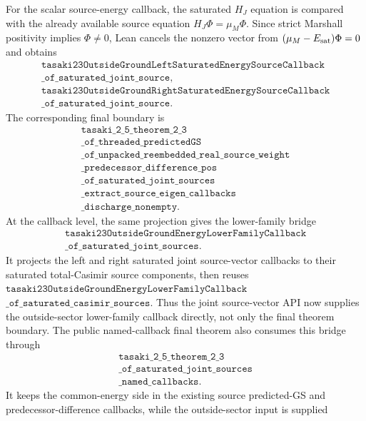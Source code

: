 \documentclass[a4paper,11pt]{article}
\begin{document}
For the scalar source-energy callback, the saturated \(H_J\) equation is
compared with the already available source equation
\(H_J\Phi=\mu_M\Phi\).  Since strict Marshall positivity implies
\(\Phi\neq0\), Lean cancels the nonzero vector from
\((\mu_M-E_{\rm sat})\Phi=0\) and obtains
\[
\begin{gathered}
\texttt{tasaki23OutsideGroundLeftSaturatedEnergySourceCallback}\\
\texttt{\_of\_saturated\_joint\_source},\\
\texttt{tasaki23OutsideGroundRightSaturatedEnergySourceCallback}\\
\texttt{\_of\_saturated\_joint\_source}.
\end{gathered}
\]
The corresponding final boundary is
\[
\begin{gathered}
\texttt{tasaki\_2\_5\_theorem\_2\_3}\\
\texttt{\_of\_threaded\_predictedGS}\\
\texttt{\_of\_unpacked\_reembedded\_real\_source\_weight}\\
\texttt{\_predecessor\_difference\_pos}\\
\texttt{\_of\_saturated\_joint\_sources}\\
\texttt{\_extract\_source\_eigen\_callbacks}\\
\texttt{\_discharge\_nonempty}.
\end{gathered}
\]
At the callback level, the same projection gives the lower-family bridge
\[
\begin{gathered}
\texttt{tasaki23OutsideGroundEnergyLowerFamilyCallback}\\
\texttt{\_of\_saturated\_joint\_sources}.
\end{gathered}
\]
It projects the left and right saturated joint source-vector callbacks to
their saturated total-Casimir source components, then reuses
\(\texttt{tasaki23OutsideGroundEnergyLowerFamilyCallback}\)
\(\texttt{\_of\_saturated\_casimir\_sources}\).  Thus the joint
source-vector API now supplies the outside-sector lower-family callback
directly, not only the final theorem boundary.
The public named-callback final theorem also consumes this bridge through
\[
\begin{gathered}
\texttt{tasaki\_2\_5\_theorem\_2\_3}\\
\texttt{\_of\_saturated\_joint\_sources}\\
\texttt{\_named\_callbacks}.
\end{gathered}
\]
It keeps the common-energy side in the existing source predicted-GS and
predecessor-difference callbacks, while the outside-sector input is supplied
\end{document}
